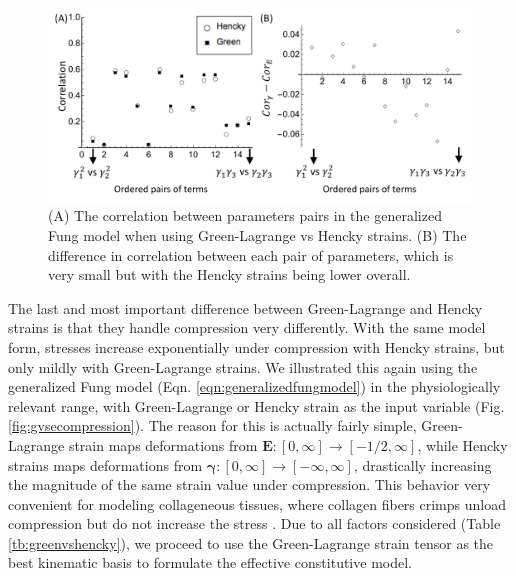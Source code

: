 \begin{figure}
\centering
\includegraphics[width=\textwidth]{Images/chapter5/gvsecorrelation}
\caption{(A) The correlation between parameters pairs in the generalized Fung model when using Green-Lagrange vs Hencky strains. (B) The difference in correlation between each pair of parameters, which is very small but with the Hencky strains being lower overall.}
\label{fig:gvsecorrelation}
\end{figure}

    
    The last and most important difference between Green-Lagrange and Hencky strains is that they handle compression very differently. With the same model form, stresses increase exponentially under compression with Hencky strains, but only mildly with Green-Lagrange strains. We illustrated this again using the generalized Fung model (Eqn. \ref{eqn:generalizedfungmodel}) in the physiologically relevant range, with Green-Lagrange or Hencky strain as the input variable (Fig. \ref{fig:gvsecompression}). The reason for this is actually fairly simple, Green-Lagrange strain maps deformations from $\mathbf{E}: [0,\infty] \rightarrow [-1/2,\infty]$, while Hencky strains maps deformations from $\mathbf{\gamma}: [0,\infty] \rightarrow [-\infty,\infty]$, drastically increasing the magnitude of the same strain value under compression. This behavior very convenient for modeling collageneous tissues, where collagen fibers crimps unload compression but do not increase the stress \cite{soares_mathematical_2017}. Due to all factors considered (Table \ref{tb:greenvshencky}), we proceed to use the Green-Lagrange strain tensor as the best kinematic basis to formulate the effective constitutive model. 
    
